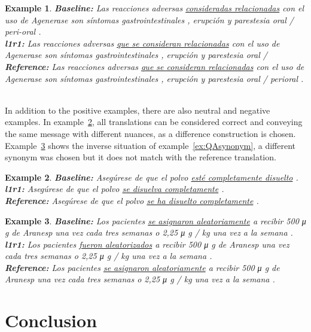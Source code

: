 \documentclass[smallextended]{svjour3}       %
\theoremstyle{break}
\newtheorem{exmp}{Example}[section]
\begin{document}
\begin{exmp}
\footnotesize
\label{ex:QAgrammar}
\textbf{Baseline:} Las reacciones adversas \underline{consideradas relacionadas} con el uso de Agenerase son síntomas gastrointestinales , erupción y parestesia oral / peri-oral . \\
\textbf{l1r1:}  Las reacciones adversas \underline{que se consideran relacionadas} con el uso de Agenerase son síntomas gastrointestinales , erupción y parestesia oral / \\
\textbf{Reference:} Las reacciones adversas \underline{que se consideran relacionadas} con el uso de Agenerase son síntomas gastrointestinales , erupción y parestesia oral / perioral . \\ \\
\end{exmp}

In addition to the positive examples, there are also neutral and negative examples. In example~\ref{ex:QAneutral}, all translations can be considered correct and conveying the same message with different nuances, as a difference construction is chosen. Example~\ref{ex:QAnegative} shows the inverse situation of example~\ref{ex:QAsynonym}, a different synonym was chosen but it does not match with the reference translation.

\begin{exmp}
\footnotesize
\label{ex:QAneutral}
\textbf{Baseline:} Asegúrese de que el polvo \underline{esté completamente disuelto} . \\
\textbf{l1r1:} Asegúrese de que el polvo \underline{se disuelva completamente} .  \\
\textbf{Reference:} Asegúrese de que el polvo \underline{se ha disuelto completamente} .
\end{exmp}

\begin{exmp}
\footnotesize
\label{ex:QAnegative}
\textbf{Baseline:} Los pacientes \underline{se asignaron aleatoriamente} a recibir 500 μ g de Aranesp una vez cada tres semanas o 2,25 μ g / kg una vez a la semana . \\
\textbf{l1r1:} Los pacientes \underline{fueron aleatorizados} a recibir 500 μ g de Aranesp una vez cada tres semanas o 2,25 μ g / kg una vez a la semana . \\
\textbf{Reference:} Los pacientes \underline{se asignaron aleatoriamente} a recibir 500 μ g de Aranesp una vez cada tres semanas o 2,25 μ g / kg una vez a la semana .
\end{exmp}

\section{Conclusion} 





\end{document}
